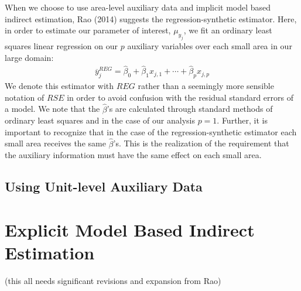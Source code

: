 \documentclass[12pt,twoside]{reedthesis}
\begin{document}
When we choose to use area-level auxiliary data and implicit model based indirect estimation, Rao (2014) suggests the regression-synthetic estimator. Here, in order to estimate our parameter of interest, \(\mu_{y_j}\), we fit an ordinary least squares linear regression on our \(p\) auxiliary variables over each small area in our large domain:
\begin{align}
\overline y_j^{REG} = \hat\beta_0 + \hat\beta_1 x_{j,1} + \cdots + \hat\beta_p x_{j,p}
\end{align}
We denote this estimator with \(REG\) rather than a seemingly more sensible notation of \(RSE\) in order to avoid confusion with the residual standard errors of a model. We note that the \(\hat \beta\)'s are calculated through standard methods of ordinary least squares and in the case of our analysis \(p=1\). Further, it is important to recognize that in the case of the regression-synthetic estimator each small area receives the same \(\hat\beta\)'s. This is the realization of the requirement that the auxiliary information must have the same effect on each small area.

\hypertarget{using-unit-level-auxiliary-data}{%
\subsection{Using Unit-level Auxiliary Data}\label{using-unit-level-auxiliary-data}}

\hypertarget{explicit-model-based-indirect-estimation}{%
\section{Explicit Model Based Indirect Estimation}\label{explicit-model-based-indirect-estimation}}

(this all needs significant revisions and expansion from Rao)
\end{document}
